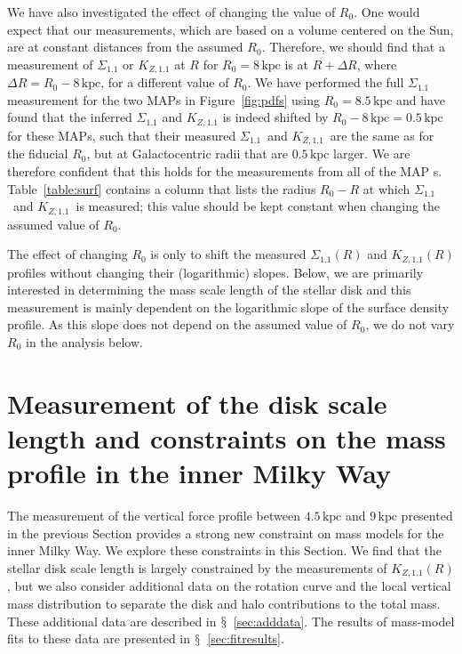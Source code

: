 \documentclass{emulateapj}
\renewcommand{\tablename}{Table}
\renewcommand{\figurename}{Figure}
\newcommand{\sectionname}{$\mathsection$}
\newcommand{\map}{MAP}
\newcommand{\kpc}{\ensuremath{\,\mathrm{kpc}}}
\newcommand{\sigoneone}{\ensuremath{\Sigma_{1.1}}}
\newcommand{\kzoneone}{\ensuremath{K_{Z,1.1}}}
\begin{document}
We have also investigated the effect of changing the value of
$R_0$. One would expect that our measurements, which are based on a
volume centered on the Sun, are at constant distances from the assumed
$R_0$. Therefore, we should find that a measurement of $\sigoneone$ or
$\kzoneone$ at $R$ for $R_0 = 8\kpc$ is at $R + \Delta R$, where
$\Delta R = R_0-8\kpc$, for a different value of $R_0$. We have
performed the full $\sigoneone$ measurement for the two \map s in
\figurename~\ref{fig:pdfs} using $R_0 = 8.5\kpc$ and have found that
the inferred $\sigoneone$ and $\kzoneone$ is indeed shifted by $R_0 -
8\kpc = 0.5\kpc$ for these \map s, such that their measured
\sigoneone\ and \kzoneone\ are the same as for the fiducial $R_0$, but
at Galactocentric radii that are $0.5\kpc$ larger. We are therefore
confident that this holds for the measurements from all of the \map
s. \tablename~\ref{table:surf} contains a column that lists the radius
$R_0-R$ at which \sigoneone\ and \kzoneone\ is measured; this value
should be kept constant when changing the assumed value of $R_0$.

The effect of changing $R_0$ is only to shift the measured
$\sigoneone(R)$ and $\kzoneone(R)$ profiles without changing their
(logarithmic) slopes. Below, we are primarily interested in
determining the mass scale length of the stellar disk and this
measurement is mainly dependent on the logarithmic slope of the
surface density profile. As this slope does not depend on the assumed
value of $R_0$, we do not vary $R_0$ in the analysis below.

\section{Measurement of the disk scale length and constraints on the mass profile in the inner Milky Way}\label{sec:potentialfit}

The measurement of the vertical force profile between $4.5\kpc$ and
$9\kpc$ presented in the previous Section provides a strong new
constraint on mass models for the inner Milky Way. We explore these
constraints in this Section. We find that the stellar disk scale
length is largely constrained by the measurements of $\kzoneone(R)$,
but we also consider additional data on the rotation curve and the
local vertical mass distribution to separate the disk and halo
contributions to the total mass. These additional data are described
in \sectionname~\ref{sec:adddata}. The results of mass-model fits to
these data are presented in \sectionname~\ref{sec:fitresults}.
\end{document}
